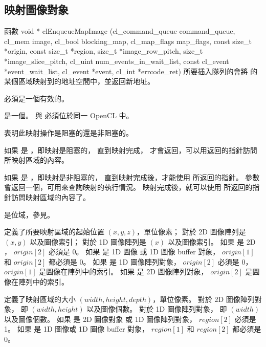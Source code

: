 \subsection{映射圖像對象}

函數
\startclc
void * clEnqueueMapImage (cl_command_queue command_queue,
			cl_mem image,
			cl_bool blocking_map,
			cl_map_flags map_flags,
			const size_t *origin,
			const size_t *region,
			size_t *image_row_pitch,
			size_t *image_slice_pitch,
			cl_uint num_events_in_wait_list,
			const cl_event *event_wait_list,
			cl_event *event,
			cl_int *errcode_ret)
\stopclc
所要插入隊列的會將  的某個區域映射到的地址空間中，並返回新地址。

 必須是一個有效的。

 是一個。
 與  必須位於同一 OpenCL 中。

 表明此映射操作是{\ftRef 阻塞的}還是{\ftRef 非阻塞的}。

如果  是 ，即映射是阻塞的，
直到映射完成，  才會返回，可以用返回的指針訪問所映射區域的內容。

如果  是 ，即映射是非阻塞的，
直到映射完成後，才能使用  所返回的指針。
參數  會返回一個，可用來查詢映射的執行情況。
映射完成後，就可以使用  所返回的指針訪問映射區域的內容了。

 是位域，參見。

 定義了所要映射區域的起始位置 $(x, y, z)$，單位像素；
對於 2D 圖像陣列是 $(x, y)$ 以及圖像索引；
對於 1D 圖像陣列是 $(x)$ 以及圖像索引。
如果  是 2D ， $origin[2]$ 必須是 0。
如果  是 1D 圖像 或 1D 圖像 buffer 對象， $origin[1]$ 和 $origin[2]$ 都必須是 0。
如果  是 1D 圖像陣列對象， $origin[2]$ 必須是 0， $origin[1]$ 是圖像在陣列中的索引。
如果  是 2D 圖像陣列對象， $origin[2]$ 是圖像在陣列中的索引。

 定義了映射區域的大小 $(width, height, depth)$，單位像素。
對於 2D 圖像陣列對象， 即 $(width, height)$ 以及圖像個數。
對於 1D 圖像陣列對象， 即 $(width)$ 以及圖像個數。
如果  是 2D 圖像對象 或 1D 圖像陣列對象， $region[2]$ 必須是 1。
如果  是 1D 圖像或 1D 圖像 buffer 對象， $region[1]$ 和 $region[2]$ 都必須是 0。

